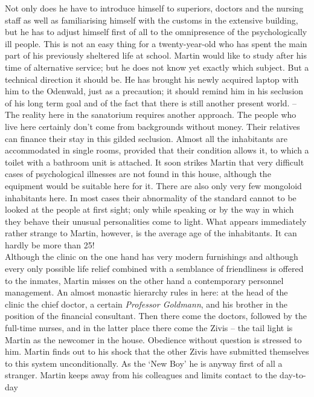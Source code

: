 Not only does he have to introduce himself to superiors, doctors and the nursing staff as well as 
familiarising himself with the customs in the extensive building, but he has to adjust
himself first of all to the omnipresence of the psychologically ill people. 
This is not an easy thing for a twenty-year-old who has spent the main part of his 
previously sheltered life at school.
Martin would like to study after his time of alternative service; but he does not 
know yet exactly which subject.
But a technical direction it should be. 
He has brought his newly acquired laptop with him to the Odenwald, just as a 
precaution; it should remind him in his seclusion of his long term goal and of the 
fact that there is still another present world. -- \\ 
The reality here in the sanatorium requires another approach. 
The people who live here certainly don't come from backgrounds without money. Their 
relatives can finance their stay in this gilded seclusion. 
Almost all the inhabitants are accommodated in single rooms, provided that their 
condition allows it, to which a toilet with a bathroom unit is attached. 
It soon strikes Martin that very difficult cases of psychological illnesses are not 
found in this house, although the equipment would be suitable here for it. 
There are also only very few mongoloid inhabitants here.
In most cases their abnormality of the standard cannot to be looked at the people at 
first sight; only while speaking or by the way in which they behave their unusual
personalities come to light. 
What appears immediately rather strange to Martin, however, is the average age of 
the inhabitants. 
It can hardly be more than 25! \\ 
Although the clinic on the one hand has very modern furnishings and although every only
possible life relief combined with a semblance of friendliness is offered to the inmates, 
Martin misses on the other hand a contemporary personnel management. 
An almost monastic hierarchy rules in here: at the head of the clinic the chief 
doctor, a certain {\em Professor Goldmann\/}, and his brother in the position of
the financial consultant.
Then there come the doctors, followed by the full-time nurses, and in the latter
place there come the Zivis -- the tail light is Martin as the newcomer in the house. 
Obedience without question is stressed to him. 
Martin finds out to his shock that the other Zivis have submitted themselves to this
system unconditionally. 
As the `New Boy' he is anyway first of all a stranger. 
Martin keeps away from his colleagues and limits contact to the day-to-day 

